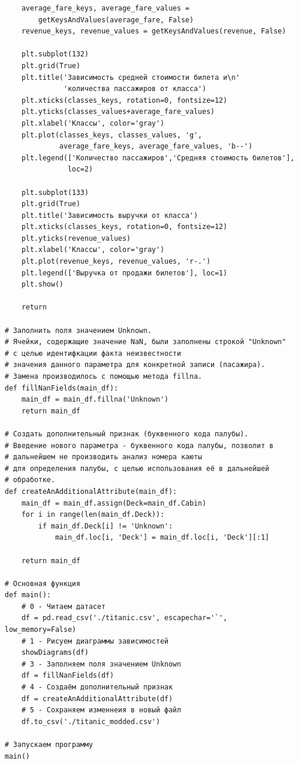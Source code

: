 \documentclass[a4paper]{article}
\begin{document}
{\begin{verbatim}
    average_fare_keys, average_fare_values =
        getKeysAndValues(average_fare, False)
    revenue_keys, revenue_values = getKeysAndValues(revenue, False)

    plt.subplot(132)
    plt.grid(True)
    plt.title('Зависимость средней стоимости билета и\n'
              'количества пассажиров от класса')
    plt.xticks(classes_keys, rotation=0, fontsize=12)
    plt.yticks(classes_values+average_fare_values)
    plt.xlabel('Классы', color='gray')
    plt.plot(classes_keys, classes_values, 'g',
             average_fare_keys, average_fare_values, 'b--')
    plt.legend(['Количество пассажиров','Средняя стоимость билетов'],
               loc=2)

    plt.subplot(133)
    plt.grid(True)
    plt.title('Зависимость выручки от класса')
    plt.xticks(classes_keys, rotation=0, fontsize=12)
    plt.yticks(revenue_values)
    plt.xlabel('Классы', color='gray')
    plt.plot(revenue_keys, revenue_values, 'r-.')
    plt.legend(['Выручка от продажи билетов'], loc=1)
    plt.show()

    return

# Заполнить поля значением Unknown.
# Ячейки, содержащие значение NaN, были заполнены строкой "Unknown" 
# с целью идентифкации факта неизвестности
# значения данного параметра для конкретной записи (пасажира). 
# Замена производилось с помощью метода fillna.
def fillNanFields(main_df):
    main_df = main_df.fillna('Unknown')
    return main_df

# Создать дополнительный признак (буквенного кода палубы).
# Введение нового параметра - буквенного кода палубы, позволит в
# дальнейшем не производить анализ номера каюты
# для определения палубы, с целью использования её в дальнейшей
# обработке.
def createAnAdditionalAttribute(main_df):
    main_df = main_df.assign(Deck=main_df.Cabin)
    for i in range(len(main_df.Deck)):
        if main_df.Deck[i] != 'Unknown':
            main_df.loc[i, 'Deck'] = main_df.loc[i, 'Deck'][:1]
            
    return main_df

# Основная функция
def main():
    # 0 - Читаем датасет
    df = pd.read_csv('./titanic.csv', escapechar='`', low_memory=False)
    # 1 - Рисуем диаграммы зависимостей
    showDiagrams(df)
    # 3 - Заполняем поля значением Unknown
    df = fillNanFields(df)
    # 4 - Создаём дополнительный признак
    df = createAnAdditionalAttribute(df)
    # 5 - Сохраняем изменнеия в новый файл
    df.to_csv('./titanic_modded.csv')

# Запускаем программу
main()
    \end{verbatim}
}
 
\end{document}
